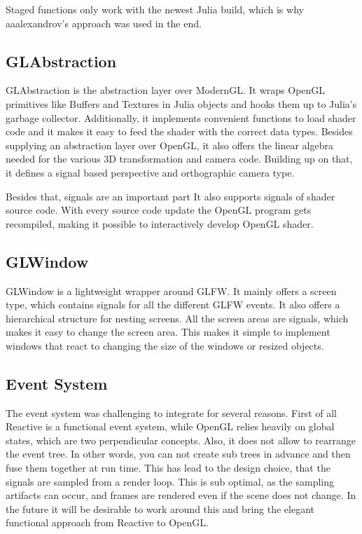 Staged functions only work with the newest Julia build, which is why aaalexandrov’s approach was used in the end.


\subsection{GLAbstraction}
GLAbstraction is the abstraction layer over ModernGL.
It wraps \ac{OpenGL} primitives like Buffers and Textures in Julia objects and hooks them up to Julia's garbage collector.
Additionally, it implements convenient functions to load shader code and it makes it easy to feed the shader with the correct data types. 
Besides supplying an abstraction layer over \ac{OpenGL}, it also offers the linear algebra needed for the various 3D transformation and camera code.
Building up on that, it defines a signal based perspective and orthographic camera type.

Besides that, signals are an important part 
It also supports signals of shader source code. With every source code update the OpenGL program gets recompiled, making it possible to interactively develop OpenGL shader.

\subsection{GLWindow}
GLWindow is a lightweight wrapper around GLFW.
It mainly offers a screen type, which contains signals for all the different GLFW events. 
It also offers a hierarchical structure for nesting screens.
All the screen areas are signals, which makes it easy to change the screen area. 
This makes it simple to implement windows that react to changing the size of the windows or resized objects.

\subsection{Event System}

The event system was challenging to integrate for several reasons.
First of all Reactive is a functional event system, while \ac{OpenGL} relies heavily on global states, which are two perpendicular concepts.
Also, it does not allow to rearrange the event tree. 
In other words, you can not create sub trees in advance and then fuse them together at run time.
This has lead to the design choice, that the signals are sampled from a render loop.
This is sub optimal, as the sampling artifacts can occur, and frames are rendered even if the scene does not change.
In the future it will be desirable to work around this and bring the elegant functional approach from Reactive to OpenGL.


